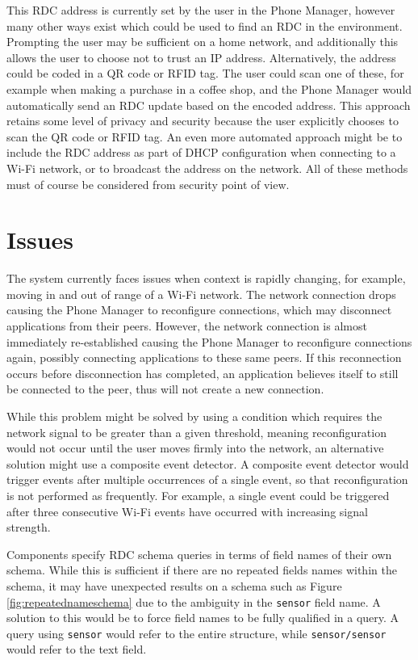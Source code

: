 \documentclass[12pt,twoside,notitlepage]{report}
\begin{document}
This RDC address is currently set by the user in the Phone Manager, however many other ways exist which could be used to find an RDC in the environment. 
Prompting the user may be sufficient on a home network, and additionally this allows the user to choose not to trust an IP address. 
Alternatively, the address could be coded in a QR code or RFID tag. 
The user could scan one of these, for example when making a purchase in a coffee shop, and the Phone Manager would automatically send an RDC update based on the encoded address. 
This approach retains some level of privacy and security because the user explicitly chooses to scan the QR code or RFID tag. 
An even more automated approach might be to include the RDC address as part of DHCP configuration when connecting to a Wi-Fi network, or to broadcast the address on the network. 
All of these methods must of course be considered from security point of view. 

\section{Issues}
The system currently faces issues when context is rapidly changing, for example, moving in and out of range of a Wi-Fi network. 
The network connection drops causing the Phone Manager to reconfigure connections, which may disconnect applications from their peers.
However, the network connection is almost immediately re-established causing the Phone Manager to reconfigure connections again, possibly connecting applications to these same peers. 
If this reconnection occurs before disconnection has completed, an application believes itself to still be connected to the peer, thus will not create a new connection.

While this problem might be solved by using a condition which requires the network signal to be greater than a given threshold, meaning reconfiguration would not occur until the user moves firmly into the network, an alternative solution might use a composite event detector. 
A composite event detector would trigger events after multiple occurrences of a single event, so that reconfiguration is not performed as frequently. 
For example, a single event could be triggered after three consecutive Wi-Fi events have occurred with increasing signal strength. 

Components specify RDC schema queries in terms of field names of their own schema.
While this is sufficient if there are no repeated fields names within the schema, it may have unexpected results on a schema such as Figure \ref{fig:repeatednameschema} due to the ambiguity in the {\tt sensor} field name. 
A solution to this would be to force field names to be fully qualified in a query. 
A query using {\tt sensor} would refer to the entire structure, while {\tt sensor/sensor} would refer to the text field.
\end{document}
